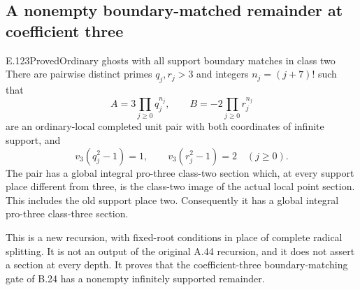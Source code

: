\subsection{A nonempty boundary-matched remainder at coefficient three}

\begin{result}{E.123}{Proved}{Ordinary ghosts with all support boundary matches in class two}
There are pairwise distinct primes $q_j,r_j>3$ and integers
$n_j=(j+7)!$ such that
\[
 A=3\prod_{j\geq0}q_j^{n_j},\qquad
 B=-2\prod_{j\geq0}r_j^{n_j}
\]
are an ordinary-local completed unit pair with both coordinates of
infinite support, and
\[
 v_3(q_j^2-1)=1,\qquad v_3(r_j^2-1)=2
 \quad(j\geq0).
\]
The pair has a global integral pro-three class-two section which,
at every support place different from three, is the class-two image
of the actual local point section. This includes the old support
place two. Consequently it has a global integral pro-three
class-three section.

This is a new recursion, with fixed-root conditions in place of
complete radical splitting. It is not an output of the original
A.44 recursion, and it does not assert a section at every depth.
It proves that the coefficient-three boundary-matching gate of
B.24 has a nonempty infinitely supported remainder.
\end{result}
